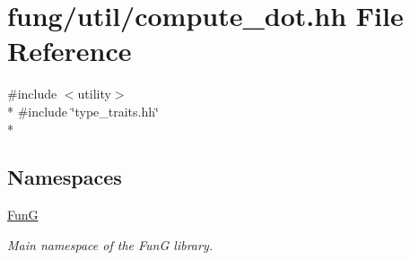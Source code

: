 \hypertarget{compute__dot_8hh}{\section{fung/util/compute\-\_\-dot.hh File Reference}
\label{compute__dot_8hh}
}
{\ttfamily \#include $<$utility$>$}\\*
{\ttfamily \#include \char`\"{}type\-\_\-traits.\-hh\char`\"{}}\\*
\subsection*{Namespaces}
\begin{DoxyCompactItemize}
\item 
\hyperlink{namespaceFunG}{Fun\-G}
\begin{DoxyCompactList}\small\item\em Main namespace of the Fun\-G library. \end{DoxyCompactList}\end{DoxyCompactItemize}
